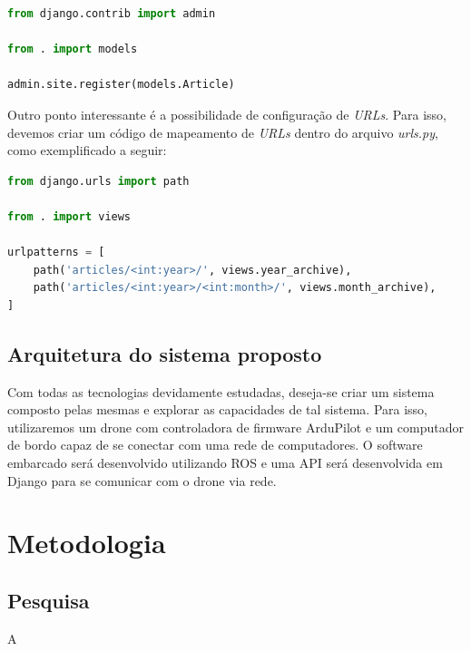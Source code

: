 \documentclass[12pt,a4paper,oneside]{book}
\begin{document}
\begin{lstlisting}[language=Python]
from django.contrib import admin

from . import models

admin.site.register(models.Article)
\end{lstlisting}

Outro ponto interessante é a possibilidade de configuração de \textit{URLs}. Para isso, devemos criar um código de mapeamento de \textit{URLs} dentro do arquivo \textit{urls.py}, como exemplificado a seguir:

\begin{lstlisting}[language=Python]
from django.urls import path

from . import views

urlpatterns = [
    path('articles/<int:year>/', views.year_archive),
    path('articles/<int:year>/<int:month>/', views.month_archive),
]
\end{lstlisting}


\section{Arquitetura do sistema proposto}

Com todas as tecnologias devidamente estudadas, deseja-se criar um sistema composto pelas mesmas e explorar as capacidades de tal sistema. Para isso, utilizaremos um drone com controladora de firmware ArduPilot e um computador de bordo capaz de se conectar com uma rede de computadores. O software embarcado será desenvolvido utilizando ROS e uma API será desenvolvida em Django para se comunicar com o drone via rede. 



\chapter{Metodologia}
\label{chapter:Metodologia}
%
\thispagestyle{empty} 
%
\section{Pesquisa}
%
A 
%
\end{document}
